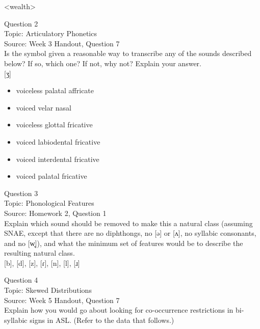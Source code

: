 \documentclass[12pt]{article}
\begin{document}
<wealth>


\newpage

{\large Question 2}\\

Topic: Articulatory Phonetics\\
Source: Week 3 Handout, Question 7\\

Is the symbol given a reasonable way to transcribe any of the sounds described below? If so, which one? If not, why not? Explain your answer.\\

{[ʒ]}

\begin{itemize} \item voiceless palatal affricate \item voiced velar nasal \item voiceless glottal fricative \item voiced labiodental fricative \item voiced interdental fricative \item voiced palatal fricative \end{itemize}


\newpage

{\large Question 3}\\

Topic: Phonological Features\\
Source: Homework 2, Question 1\\

Explain which sound should be removed to make this a natural class (assuming SNAE, except that there are no diphthongs, no [ə] or [ʌ], no syllabic consonants, and no [w̥]), and what the minimum set of features would be to describe the resulting natural class.\\

{[b]}, {[d]}, {[z]}, {[ɾ]}, {[n]}, {[l]}, {[ɹ]}


\newpage

{\large Question 4}\\

Topic: Skewed Distributions\\
Source: Week 5 Handout, Question 7\\

Explain how you would go about looking for co-occurrence restrictions in bi-syllabic signs in ASL. (Refer to the data that follows.)\\
\end{document}
